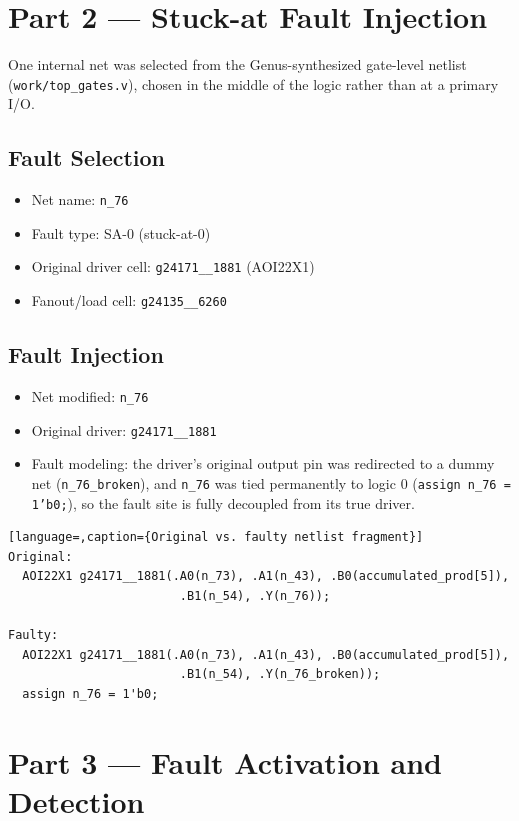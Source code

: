 \documentclass[11pt]{article}
\begin{document}
\section{Part 2 --- Stuck-at Fault Injection}
One internal net was selected from the Genus-synthesized gate-level netlist
(\texttt{work/top\_gates.v}), chosen in the middle of the logic rather than at a primary I/O.

\subsection{Fault Selection}
\begin{itemize}
    \item Net name: \texttt{n\_76}
    \item Fault type: SA-0 (stuck-at-0)
    \item Original driver cell: \texttt{g24171\_\_1881} (AOI22X1)
    \item Fanout/load cell: \texttt{g24135\_\_6260}
\end{itemize}

\subsection{Fault Injection}
\begin{itemize}
    \item Net modified: \texttt{n\_76}
    \item Original driver: \texttt{g24171\_\_1881}
    \item Fault modeling: the driver's original output pin was redirected to a dummy net
    (\texttt{n\_76\_broken}), and \texttt{n\_76} was tied permanently to logic 0
    (\texttt{assign n\_76 = 1'b0;}), so the fault site is fully decoupled from its true driver.
\end{itemize}

\begin{lstlisting}[language=,caption={Original vs. faulty netlist fragment}]
Original:
  AOI22X1 g24171__1881(.A0(n_73), .A1(n_43), .B0(accumulated_prod[5]),
                        .B1(n_54), .Y(n_76));

Faulty:
  AOI22X1 g24171__1881(.A0(n_73), .A1(n_43), .B0(accumulated_prod[5]),
                        .B1(n_54), .Y(n_76_broken));
  assign n_76 = 1'b0;
\end{lstlisting}

\section{Part 3 --- Fault Activation and Detection}
\end{document}
